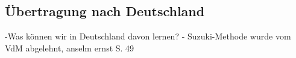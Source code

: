 







\subsection{Übertragung nach Deutschland}


-Was können wir in Deutschland davon lernen? - Suzuki-Methode wurde vom VdM
abgelehnt, anselm ernst S. 49


